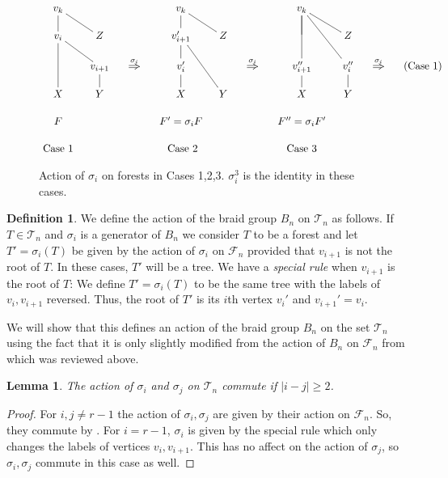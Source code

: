 \documentclass[11pt]{amsart}
\newtheorem{lem}[thm]{Lemma}
\theoremstyle{definition}
\newtheorem{defn}[thm]{Definition}
\theoremstyle{remark}
\numberwithin{equation}{section}
\newcommand{\cF}{\ensuremath{{\mathcal{F}}}}
\newcommand{\cT}{\ensuremath{{\mathcal{T}}}}
\begin{document}
\begin{figure}[ht]
\[
\xymatrixrowsep{12pt}\xymatrixcolsep{10pt}
\xymatrix{%
v_k\ar@{-}[d] &&&& v_k\ar@{-}[d] &  & && v_k\ar@{-}[d]\ar@{-}[dd]&  &  \\ %
v_i\ar@{-}[dd]\ar@{-}[dr]  & Z\ar@{-}[ul] &&& v_{i+1}'\ar@{-}[ddr] &Z\ar@{-}[ul]&&&  &  Z\ar@{-}[ul] &\\ %
 & v_{i+1}\ar@{-}[d] &   \ar@{=>}[r]^{\sigma_i}  & & v_i'\ar@{-}[d]\ar@{-}[u] & &  \ar@{=>}[r]^{\sigma_i}  && v_{i+1}''\ar@{-}[d] &  v_i''\ar@{-}[uul]\ar@{-}[d] & \ar@{=>}[r]^{\sigma_i} & & (\text{Case 1}) \\ %
	X&Y&&&X  &Y  & && X & Y\\%
	F& &&&F'=\sigma_iF&   &&&F''=\sigma_iF' & && 
\\	\text{Case 1}  &&&& \text{ Case 2}  &&&&\text{Case 3} && 
	}%
\]
\caption{Action of $\sigma_i$ on forests in Cases 1,2,3. $\sigma_i^3$ is the identity in these cases.}\label{fig: braid example}
\end{figure}

\begin{defn}\label{def: Bn action on Tn}
We define the action of the braid group $B_n$ on $\cT_n$ as follows. If $T\in \cT_n$ and $\sigma_i$ is a generator of $B_n$ we consider $T$ to be a forest and let $T'=\sigma_i(T)$ be given by the action of $\sigma_i$ on $\cF_n$ provided that $v_{i+1}$ is not the root of $T$. In these cases, $T'$ will be a tree. We have a \emph{special rule} when $v_{i+1}$ is the root of $T$: We define $T'=\sigma_i(T)$ to be the same tree with the labels of $v_i,v_{i+1}$ reversed. Thus, the root of $T'$ is its $i$th vertex $v_i'$ and $v_{i+1}'=v_i$.
\end{defn}


We will show that this defines an action of the braid group $B_n$ on the set $\cT_n$ using the fact that it is only slightly modified from the action of $B_n$ on $\cF_n$ from \cite{Ig-Sen} which was reviewed above. 

\begin{lem}\label{lem: action of Bn on Tn satisfies commutativity relations}
The action of $\sigma_i$ and $\sigma_j$ on $\cT_n$ commute if $|i-j|\ge2$.
\end{lem}

\begin{proof}
For $i,j\neq r-1$ the action of $\sigma_i,\sigma_j$ are given by their action on $\cF_n$. So, they commute by \cite{Ig-Sen}. For $i=r-1$, $\sigma_i$ is given by the special rule which only changes the labels of vertices $v_i,v_{i+1}$. This has no affect on the action of $\sigma_j$, so $\sigma_i,\sigma_j$ commute in this case as well.
\end{proof}
\end{document}
